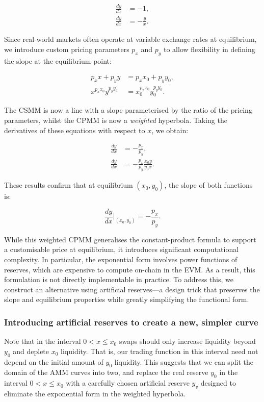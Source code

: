 \documentclass{article}
\begin{document}
\begin{align}
    \frac{dy}{dx} &= -1, \\
    \frac{dy}{dx} &= -\frac{y}{x}.
\end{align}

Since real-world markets often operate at variable exchange rates at equilibrium, we introduce custom pricing parameters $p_x$ and $p_y$ to allow flexibility in defining the slope at the equilibrium point:

\begin{align}
    \label{eq:weighted-line}
    p_x x + p_y y &= p_x x_0 + p_y y_0, \\
    \label{eq:exponential-form}
    x^{p_x x_0} y^{p_y y_0} &= x_0^{p_x x_0} y_0^{p_y y_0}.
\end{align}

The CSMM is now a line with a slope parameterised by the ratio of the pricing parameters, whilst the CPMM is now a \textit{weighted} hyperbola. Taking the derivatives of these equations with respect to $x$, we obtain:

\begin{align}
    \frac{dy}{dx} &= -\frac{p_x}{p_y}, \\
    \frac{dy}{dx} &= -\frac{p_x}{p_y} \frac{x_0 y}{y_0 x}.
\end{align}

These results confirm that at equilibrium $(x_0, y_0)$, the slope of both functions is:

\[
\frac{dy}{dx} \Big|_{(x_0, y_0)} = -\frac{p_x}{p_y}.
\]

While this weighted CPMM generalises the constant-product formula to support a customisable price at equilibrium, it introduces significant computational complexity. In particular, the exponential form involves power functions of reserves, which are expensive to compute on-chain in the EVM. As a result, this formulation is not directly implementable in practice. To address this, we construct an alternative using artificial reserves—a design trick that preserves the slope and equilibrium properties while greatly simplifying the functional form.

\subsubsection{Introducing artificial reserves to create a new, simpler curve}

Note that in the interval $0 < x \leq x_0$ swaps should only increase liquidity beyond $y_0$ and deplete $x_0$ liquidity. That is, our trading function in this interval need not depend on the initial amount of $y_0$ liquidity. This suggests that we can split the domain of the AMM curves into two, and replace the real reserve $y_0$ in the interval $0 < x \leq x_0$ with a carefully chosen artificial reserve $y_v$ designed to eliminate the exponential form in the weighted hyperbola. 
\end{document}
